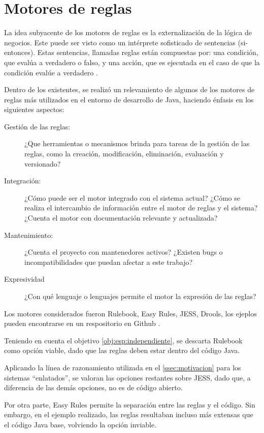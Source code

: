 \section{Motores de reglas}\label{sec:motores}

La idea subyacente de los motores de reglas es la externalización de la lógica de negocios. Este puede ser visto como un intérprete sofisticado de sentencias  (si-entonces). Estas sentencias, llamadas reglas están compuestas por: una condición, que evalúa a verdadero o falso, y una acción, que es ejecutada en el caso de que la condición evalúe a verdadero \cite{qusay2005jsr94}.

Dentro de los existentes, se realizó un relevamiento de algunos de los motores de reglas más utilizados en el entorno de desarrollo de Java, haciendo énfasis en los siguientes aspectos:
\begin{description}
    \item[Gestión de las reglas:] 
    ¿Que herramientas o mecanismos brinda para tareas de la gestión de las reglas, como la creación, modificación, eliminación, evaluación y versionado?
    \item[Integración:]
    ¿Cómo puede ser el motor integrado con el sistema actual? ¿Cómo se realiza el intercambio de información entre el motor de reglas y el sistema? ¿Cuenta el motor con documentación relevante y actualizada?
    \item[Mantenimiento:]
    ¿Cuenta el proyecto con mantenedores activos? ¿Existen bugs o incompatibilidades que puedan afectar a este trabajo?
    \item[Expresividad]
    ¿Con qué lenguaje o lenguajes permite el motor la expresión de las reglas?
\end{description}

Los motores considerados fueron Rulebook, Easy Rules, JESS, Drools, los ejeplos pueden encontrarse en un respositorio en Github \cite{ejemplos}.

Teniendo en cuenta el objetivo \ref{obj:esp:independiente}, se descarta Rulebook como opción viable, dado que las reglas deben estar dentro del código Java.

Aplicando la línea de razonamiento utilizada en el \cref{ssec:motivacion} para los sistemas ``enlatados'', se valoran las opciones restantes sobre JESS, dado que, a diferencia de las demás opciones, no es de código abierto.

Por otra parte, Easy Rules permite la separación entre las reglas y el código. Sin embargo, en el ejemplo realizado, las reglas resultaban incluso más extensas que el código Java base, volviendo la opción inviable.

